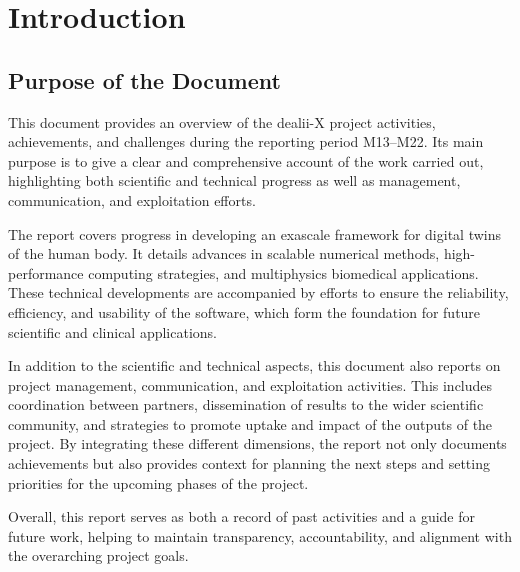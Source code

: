 \documentclass[a4paper,12pt, numbers]{article}
\begin{document}
	\vspace*{2cm}
	
	\disclaimer
	
	\newpage
	
	\tableofcontents %
	
	\newpage
	
	\section{{Introduction}}
	
	
	\subsection{Purpose of the Document}
	
	This document provides an overview of the dealii-X project activities, achievements, and challenges during the reporting period M13–M22. Its main purpose is to give a clear and comprehensive account of the work carried out, highlighting both scientific and technical progress as well as management, communication, and exploitation efforts. 
	
	The report covers progress in developing an exascale framework for digital twins of the human body. It details advances in scalable numerical methods, high-perfor\-mance computing strategies, and multiphysics biomedical applications. These technical developments are accompanied by efforts to ensure the reliability, efficiency, and usability of the software, which form the foundation for future scientific and clinical applications.
	
	In addition to the scientific and technical aspects, this document also reports on project management, communication, and exploitation activities. This includes coordination between partners, dissemination of results to the wider scientific community, and strategies to promote uptake and impact of the outputs of the project. By integrating these different dimensions, the report not only documents achievements but also provides context for planning the next steps and setting priorities for the upcoming phases of the project.
	
	Overall, this report serves as both a record of past activities and a guide for future work, helping to maintain transparency, accountability, and alignment with the overarching project goals.
	
	
\end{document}
